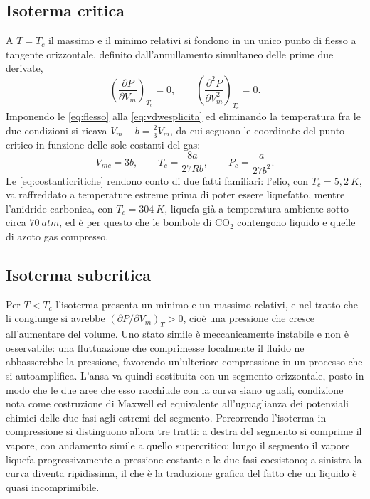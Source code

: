 \subsection{Isoterma critica}

A $T = T_c$ il massimo e il minimo relativi si fondono in un unico punto di flesso a tangente orizzontale, definito dall'annullamento simultaneo delle prime due derivate,
\begin{equation}
    \left(\frac{\partial P}{\partial V_m}\right)_{T_c} = 0,
    \qquad
    \left(\frac{\partial^2 P}{\partial V_m^2}\right)_{T_c} = 0 .
    \label{eq:flesso}
\end{equation}
Imponendo le \eqref{eq:flesso} alla \eqref{eq:vdwesplicita} ed eliminando la temperatura fra le due condizioni si ricava $V_m - b = \tfrac{2}{3}V_m$, da cui seguono le coordinate del punto critico in funzione delle sole costanti del gas:
\begin{equation}
    V_{mc} = 3b,
    \qquad
    T_c = \frac{8a}{27Rb},
    \qquad
    P_c = \frac{a}{27b^2}.
    \label{eq:costanticritiche}
\end{equation}
Le \eqref{eq:costanticritiche} rendono conto di due fatti familiari: l'elio, con $T_c = 5{,}2 \ K$, va raffreddato a temperature estreme prima di poter essere liquefatto, mentre l'anidride carbonica, con $T_c = 304 \ K$, liquefa già a temperatura ambiente sotto circa $70 \ atm$, ed è per questo che le bombole di $\mathrm{CO_2}$ contengono liquido e quelle di azoto gas compresso.

\subsection{Isoterma subcritica}

Per $T < T_c$ l'isoterma presenta un minimo e un massimo relativi, e nel tratto che li congiunge si avrebbe $(\partial P/\partial V_m)_T > 0$, cioè una pressione che cresce all'aumentare del volume.
Uno stato simile è meccanicamente instabile e non è osservabile: una fluttuazione che comprimesse localmente il fluido ne abbasserebbe la pressione, favorendo un'ulteriore compressione in un processo che si autoamplifica.
L'ansa va quindi sostituita con un segmento orizzontale, posto in modo che le due aree che esso racchiude con la curva siano uguali, condizione nota come costruzione di Maxwell ed equivalente all'uguaglianza dei potenziali chimici delle due fasi agli estremi del segmento.
Percorrendo l'isoterma in compressione si distinguono allora tre tratti: a destra del segmento si comprime il vapore, con andamento simile a quello supercritico; lungo il segmento il vapore liquefa progressivamente a pressione costante e le due fasi coesistono; a sinistra la curva diventa ripidissima, il che è la traduzione grafica del fatto che un liquido è quasi incomprimibile.